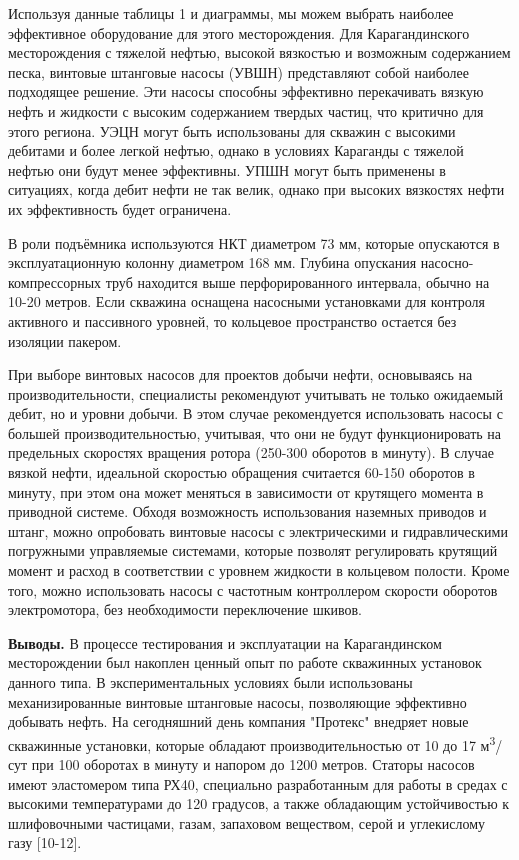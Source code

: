 \begin{multicols}{2}
Используя данные таблицы 1 и диаграммы, мы можем выбрать наиболее
эффективное оборудование для этого месторождения. Для Карагандинского
месторождения с тяжелой нефтью, высокой вязкостью и возможным
содержанием песка, винтовые штанговые насосы (УВШН) представляют собой
наиболее подходящее решение. Эти насосы способны эффективно
перекачивать вязкую нефть и жидкости с высоким содержанием твердых
частиц, что критично для этого региона. УЭЦН могут быть использованы
для скважин с высокими дебитами и более легкой нефтью, однако в
условиях Караганды с тяжелой нефтью они будут менее эффективны. УПШН
могут быть применены в ситуациях, когда дебит нефти не так велик,
однако при высоких вязкостях нефти их эффективность будет ограничена.

В роли подъёмника используются НКТ диаметром 73 мм, которые опускаются в
эксплуатационную колонну диаметром 168 мм. Глубина опускания
насосно-компрессорных труб находится выше перфорированного интервала,
обычно на 10-20 метров. Если скважина оснащена насосными установками для
контроля активного и пассивного уровней, то кольцевое пространство
остается без изоляции пакером.

При выборе винтовых насосов для проектов добычи нефти, основываясь на
производительности, специалисты рекомендуют учитывать не только
ожидаемый дебит, но и уровни добычи. В этом случае рекомендуется
использовать насосы с большей производительностью, учитывая, что они не
будут функционировать на предельных скоростях вращения ротора (250-300
оборотов в минуту). В случае вязкой нефти, идеальной скоростью обращения
считается 60-150 оборотов в минуту, при этом она может меняться в
зависимости от крутящего момента в приводной системе. Обходя возможность
использования наземных приводов и штанг, можно опробовать винтовые
насосы с электрическими и гидравлическими погружными управляемые
системами, которые позволят регулировать крутящий момент и расход в
соответствии с уровнем жидкости в кольцевом полости. Кроме того, можно
использовать насосы с частотным контроллером скорости оборотов
электромотора, без необходимости переключение шкивов.

{\bfseries Выводы.} В процессе тестирования и эксплуатации на
Карагандинском месторождении был накоплен ценный опыт по работе
скважинных установок данного типа. В экспериментальных условиях были
использованы механизированные винтовые штанговые насосы, позволяющие
эффективно добывать нефть. На сегодняшний день компания "Протекс"
внедряет новые скважинные установки, которые обладают
производительностью от 10 до 17 м\textsuperscript{3}/сут при 100
оборотах в минуту и напором до 1200 метров. Статоры насосов имеют
эластомером типа РХ40, специально разработанным для работы в средах с
высокими температурами до 120 градусов, а также обладающим устойчивостью
к шлифовочными частицами, газам, запаховом веществом, серой и
углекислому газу {[}10-12{]}.


\end{multicols}

